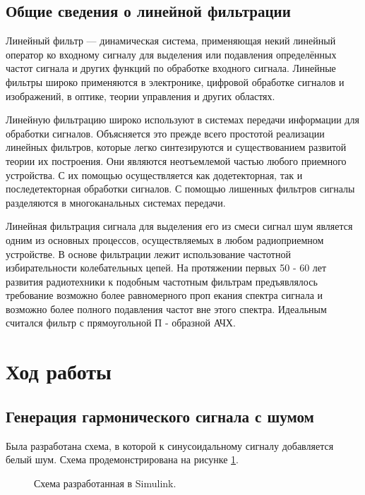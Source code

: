 \documentclass[a4paper,14pt]{extarticle}
\begin{document}
\subsection{Общие сведения о линейной фильтрации}

Линейный фильтр — динамическая система, применяющая некий линейный оператор ко входному сигналу для выделения или подавления определённых частот сигнала и других функций по обработке входного сигнала. Линейные фильтры широко применяются в электронике, цифровой обработке сигналов и изображений, в оптике, теории управления и других областях.

Линейную фильтрацию широко используют в системах передачи информации для обработки сигналов. Объясняется это прежде всего простотой реализации линейных фильтров, которые легко синтезируются и существованием развитой теории их построения. Они являются неотъемлемой частью любого приемного устройства. С их помощью осуществляется как додетекторная, так и последетекторная обработки сигналов. С помощью лишенных фильтров сигналы разделяются в многоканальных системах передачи.

Линейная фильтрация сигнала для выделения его из смеси сигнал шум является одним из основных процессов, осуществляемых в любом радиоприемном устройстве. В основе фильтрации лежит использование частотной избирательности колебательных цепей. На протяжении первых 50 - 60 лет развития радиотехники к подобным частотным фильтрам предъявлялось требование возможно более равномерного проп екания спектра сигнала и возможно более полного подавления частот вне этого спектра. Идеальным считался фильтр с прямоугольной П - образной АЧХ.


\section{Ход работы}

\subsection{Генерация гармонического сигнала с шумом}

Была разработана схема, в которой к синусоидальному сигналу добавляется белый шум. Схема продемонстрирована на рисунке \ref{001}.

\begin{figure}[H]
\caption{Схема разработанная в Simulink.}
\label{001}
\end{figure}
\end{document}
